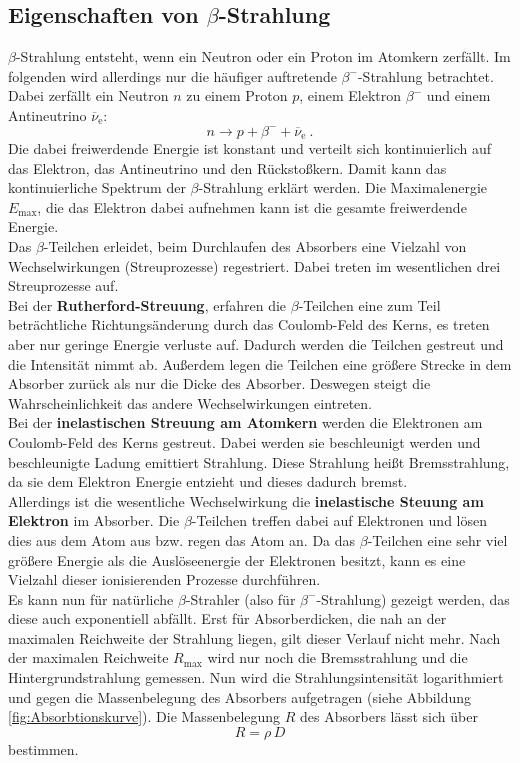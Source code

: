 \subsection{Eigenschaften von \texorpdfstring{$\beta$}{}-Strahlung}
$\beta$-Strahlung entsteht, wenn ein Neutron oder ein Proton im Atomkern zerfällt. Im folgenden wird allerdings nur die häufiger auftretende $\beta^-$-Strahlung betrachtet. Dabei zerfällt ein Neutron $n$ zu einem Proton $p$, einem Elektron $\beta^-$ und einem Antineutrino $\overline{\nu}_\text{e}$:
\begin{equation*}
	n \to p + \beta^- + \overline{\nu}_\text{e} \ .
\end{equation*}
Die dabei freiwerdende Energie ist konstant und verteilt sich kontinuierlich auf das Elektron, das Antineutrino und den Rückstoßkern. Damit kann das kontinuierliche Spektrum der $\beta$-Strahlung erklärt werden. Die Maximalenergie $E_\text{max}$, die das Elektron dabei aufnehmen kann ist die gesamte freiwerdende Energie. \\
Das $\beta$-Teilchen erleidet, beim Durchlaufen des Absorbers eine Vielzahl von Wechselwirkungen (Streuprozesse) regestriert. Dabei treten im wesentlichen drei Streuprozesse auf. \\
Bei der \textbf{Rutherford-Streuung}, erfahren die $\beta$-Teilchen eine zum Teil beträchtliche Richtungsänderung durch das Coulomb-Feld des Kerns, es treten aber nur geringe Energie verluste auf. Dadurch werden die Teilchen gestreut und die Intensität nimmt ab. Außerdem legen die Teilchen eine größere Strecke in dem Absorber zurück als nur die Dicke des Absorber. Deswegen steigt die Wahrscheinlichkeit das andere Wechselwirkungen eintreten. \\
Bei der \textbf{inelastischen Streuung am Atomkern} werden die Elektronen am Coulomb-Feld des Kerns gestreut. Dabei werden sie beschleunigt werden und beschleunigte Ladung emittiert Strahlung. Diese Strahlung heißt Bremsstrahlung, da sie dem Elektron Energie entzieht und dieses dadurch bremst. \\
Allerdings ist die wesentliche Wechselwirkung die \textbf{inelastische Steuung am Elektron} im Absorber. Die $\beta$-Teilchen treffen dabei auf Elektronen und lösen dies aus dem Atom aus bzw. regen das Atom an. Da das $\beta$-Teilchen eine sehr viel größere Energie als die Auslöseenergie der Elektronen besitzt, kann es eine Vielzahl dieser ionisierenden Prozesse durchführen. \\
Es kann nun für natürliche $\beta$-Strahler (also für $\beta^-$-Strahlung) gezeigt werden, das diese auch exponentiell abfällt. Erst für Absorberdicken, die nah an der maximalen Reichweite der Strahlung liegen, gilt dieser Verlauf nicht mehr. Nach der maximalen Reichweite $R_\text{max}$ wird nur noch die Bremsstrahlung und die Hintergrundstrahlung gemessen. Nun wird die Strahlungsintensität logarithmiert und gegen die Massenbelegung des Absorbers aufgetragen (siehe Abbildung \eqref{fig:Absorbtionskurve}). Die Massenbelegung $R$ des Absorbers lässt sich über
\begin{equation}
	R = \rho\,D
	\label{eqn:R}
\end{equation}
bestimmen.

